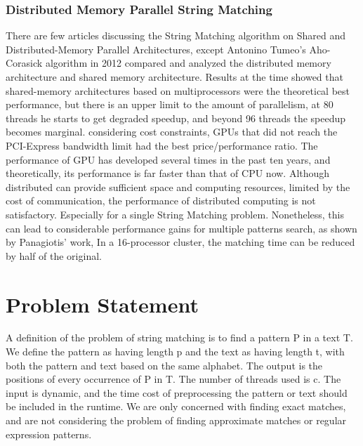 \documentclass[11pt]{article}       %
\begin{document}
\subsubsection{Distributed Memory Parallel String Matching}
There are few articles discussing the String Matching algorithm on Shared and Distributed-Memory Parallel Architectures, except Antonino Tumeo's Aho-Corasick algorithm in 2012 compared and analyzed the distributed memory architecture and shared memory architecture\cite{Distributed-Memory}. Results at the time showed that shared-memory architectures based on multiprocessors were the theoretical best performance, but there is an upper limit to the amount of parallelism, at 80 threads he starts to get degraded speedup, and beyond 96 threads the speedup becomes marginal. considering cost constraints, GPUs that did not reach the PCI-Express bandwidth limit had the best price/performance ratio. The performance of GPU has developed several times in the past ten years, and theoretically, its performance is far faster than that of CPU now. Although distributed can provide sufficient space and computing resources, limited by the cost of communication, the performance of distributed computing is not satisfactory. Especially for a single String Matching problem. Nonetheless, this can lead to considerable performance gains for multiple patterns search, as shown by Panagiotis' work\cite{MPI}, In a 16-processor cluster, the matching time can be reduced by half of the original.



\section{Problem Statement} \label{problemStatement}


A definition of the problem of string matching is to find a pattern P in a text T.  We define the pattern as having length p and the text as having length t, with both the pattern and text based on the same alphabet. The output is the positions of every occurrence of P in T. The number of threads used is c. The input is dynamic, and the time cost of preprocessing the pattern or text should be included in the runtime. We are only concerned with finding exact matches, and are not considering the problem of finding approximate matches or regular expression patterns.
\end{document}
